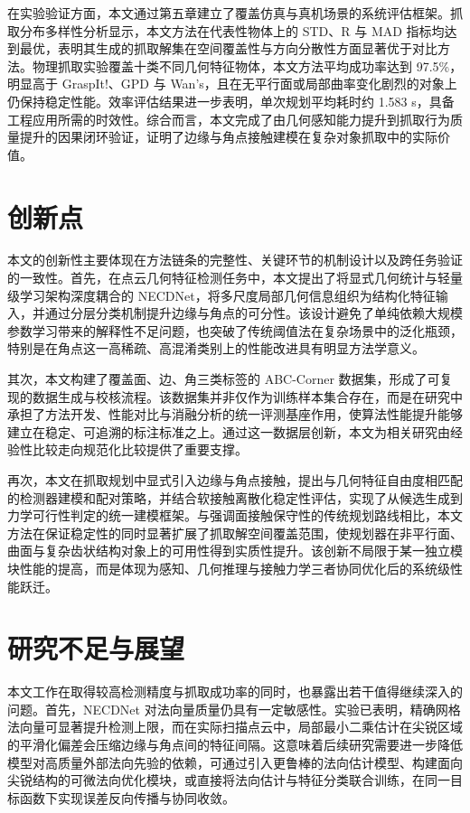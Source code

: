 在实验验证方面，本文通过第五章建立了覆盖仿真与真机场景的系统评估框架。抓取分布多样性分析显示，本文方法在代表性物体上的 STD、R 与 MAD 指标均达到最优，表明其生成的抓取解集在空间覆盖性与方向分散性方面显著优于对比方法。物理抓取实验覆盖十类不同几何特征物体，本文方法平均成功率达到 97.5\%，明显高于 GraspIt!、GPD 与 Wan's，且在无平行面或局部曲率变化剧烈的对象上仍保持稳定性能。效率评估结果进一步表明，单次规划平均耗时约 1.583 s，具备工程应用所需的时效性。综合而言，本文完成了由几何感知能力提升到抓取行为质量提升的因果闭环验证，证明了边缘与角点接触建模在复杂对象抓取中的实际价值。

\section{创新点}

本文的创新性主要体现在方法链条的完整性、关键环节的机制设计以及跨任务验证的一致性。首先，在点云几何特征检测任务中，本文提出了将显式几何统计与轻量级学习架构深度耦合的 NECDNet，将多尺度局部几何信息组织为结构化特征输入，并通过分层分类机制提升边缘与角点的可分性。该设计避免了单纯依赖大规模参数学习带来的解释性不足问题，也突破了传统阈值法在复杂场景中的泛化瓶颈，特别是在角点这一高稀疏、高混淆类别上的性能改进具有明显方法学意义。

其次，本文构建了覆盖面、边、角三类标签的 ABC-Corner 数据集，形成了可复现的数据生成与校核流程。该数据集并非仅作为训练样本集合存在，而是在研究中承担了方法开发、性能对比与消融分析的统一评测基座作用，使算法性能提升能够建立在稳定、可追溯的标注标准之上。通过这一数据层创新，本文为相关研究由经验性比较走向规范化比较提供了重要支撑。

再次，本文在抓取规划中显式引入边缘与角点接触，提出与几何特征自由度相匹配的检测器建模和配对策略，并结合软接触离散化稳定性评估，实现了从候选生成到力学可行性判定的统一建模框架。与强调面接触保守性的传统规划路线相比，本文方法在保证稳定性的同时显著扩展了抓取解空间覆盖范围，使规划器在非平行面、曲面与复杂齿状结构对象上的可用性得到实质性提升。该创新不局限于某一独立模块性能的提高，而是体现为感知、几何推理与接触力学三者协同优化后的系统级性能跃迁。

\section{研究不足与展望}
本文工作在取得较高检测精度与抓取成功率的同时，也暴露出若干值得继续深入的问题。首先，NECDNet 对法向量质量仍具有一定敏感性。实验已表明，精确网格法向量可显著提升检测上限，而在实际扫描点云中，局部最小二乘估计在尖锐区域的平滑化偏差会压缩边缘与角点间的特征间隔。这意味着后续研究需要进一步降低模型对高质量外部法向先验的依赖，可通过引入更鲁棒的法向估计模型、构建面向尖锐结构的可微法向优化模块，或直接将法向估计与特征分类联合训练，在同一目标函数下实现误差反向传播与协同收敛。

